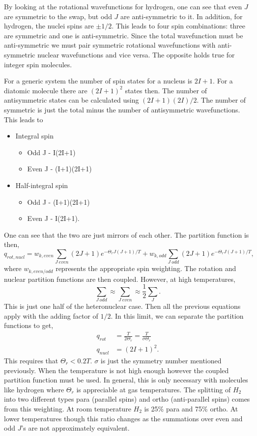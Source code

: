 By looking at the rotational wavefunctions for hydrogen, one can see that even
$J$ are symmetric to the swap, but odd $J$ are anti-symmetric to it. In
addition, for hydrogen, the nuclei spins are $\pm 1/2$. This leads to four spin
combinations: three are symmetric and one is anti-symmetric. Since the total
wavefunction must be anti-symmetric we must pair symmetric rotational
wavefunctions with anti-symmetric nuclear wavefunctions and vice versa. The
opposite holds true for integer spin molecules.

For a generic system the number of spin states for a nucleus is $2I+1$. For a
diatomic molecule there are $(2I+1)^2$ states then. The number of antisymmetric
states can be calculated using $(2I+1)(2I)/2$. The number of symmetric is just
the total minus the number of antisymmetric wavefunctions. This leads to
\begin{itemize}
	\item Integral spin
		\begin{itemize}
			\item Odd J - I(2I+1)
			\item Even J - (I+1)(2I+1)
		\end{itemize}
	\item Half-integral spin
		\begin{itemize}
			\item Odd J - (I+1)(2I+1)
			\item Even J - I(2I+1).
		\end{itemize}
\end{itemize}
One can see that the two are just mirrors of each other. The partition function
is then,
\begin{equation*}
	q_{rot,nucl} = w_{k,even}\sum_{J~even}{(2J+1)e^{-\Theta_r J(J+1)/T}} +
	w_{k,odd}\sum_{J~odd}{(2J+1)e^{-\Theta_r J(J+1)/T}},
\end{equation*}
where $w_{k,even/odd}$ represents the appropriate spin weighting. The rotation
and nuclear partition functions are then coupled. However, at high temperatures,
\begin{equation*}
	\sum_{J~odd} \approx \sum_{J~even} \approx \frac{1}{2}\sum_{J}.
\end{equation*}
This is just one half of the heteronuclear case. Then all the previous equations
apply with the adding factor of $1/2$. In this limit, we can separate the
partition functions to get,
\begin{align*}
	q_{rot} &= \frac{T}{2\Theta_r} = \frac{T}{\sigma\Theta_r}\\
	q_{nucl} &= (2I+1)^2.
\end{align*}
This requires that $\Theta_r < 0.2T$. $\sigma$ is just the symmetry number
mentioned previously. When the temperature is not high enough however the
coupled partition function must be used. In general, this is only necessary with
molecules like hydrogen where $\Theta_r$ is appreciable at gas temperatures. The
splitting of $H_2$ into two different types para (parallel spins) and ortho
(anti-parallel spins) comes from this weighting. At room temperature $H_2$ is
25\% para and 75\% ortho. At lower temperatures though this ratio changes as the
summations over even and odd $J$'s are not approximately equivalent.

